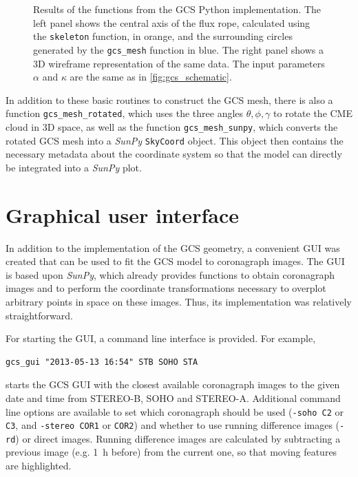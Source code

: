 \begin{figure}
	\centering
	
	\caption[Results of the functions from \acs{GCS}-Python]{Results of the functions from the \ac{GCS} Python implementation. The left panel shows the central axis of the flux rope, calculated using the \texttt{skeleton} function, in orange, and the surrounding circles generated by the \texttt{gcs\_mesh} function in blue. The right panel shows a 3D wireframe representation of the same data. The input parameters $\alpha$ and $\kappa$ are the same as in \autoref{fig:gcs_schematic}.}
	\label{fig:gcs_geometry}
\end{figure}

In addition to these basic routines to construct the \ac{GCS} mesh, there is also a function \verb|gcs_mesh_rotated|, which uses the three angles $\theta, \phi, \gamma$ to rotate the \ac{CME} cloud in 3D space, as well as the function \verb|gcs_mesh_sunpy|, which converts the rotated \ac{GCS} mesh into a \textit{SunPy} \texttt{SkyCoord} object. This object then contains the necessary metadata about the coordinate system so that the model can directly be integrated into a \textit{SunPy} plot.

\section{Graphical user interface}

In addition to the implementation of the \ac{GCS} geometry, a convenient \ac{GUI} was created that can be used to fit the \ac{GCS} model to coronagraph images. The \ac{GUI} is based upon \textit{SunPy}, which already provides functions to obtain coronagraph images and to perform the coordinate transformations necessary to overplot arbitrary points in space on these images. Thus, its implementation was relatively straightforward.

For starting the \ac{GUI}, a command line interface is provided. For example,
\begin{verbatim}
gcs_gui "2013-05-13 16:54" STB SOHO STA
\end{verbatim}
starts the \ac{GCS} \ac{GUI} with the closest available coronagraph images to the given date and time from \ac{STEREO}-B, \ac{SOHO} and \ac{STEREO}-A. Additional command line options are available to set which coronagraph should be used (\texttt{-soho C2} or \texttt{C3}, and \texttt{-stereo COR1} or \texttt{COR2}) and whether to use running difference images (\texttt{-rd}) or direct images. Running difference images are calculated by subtracting a previous image (e.g. \SI{1}{\hour} before) from the current one, so that moving features are highlighted.

